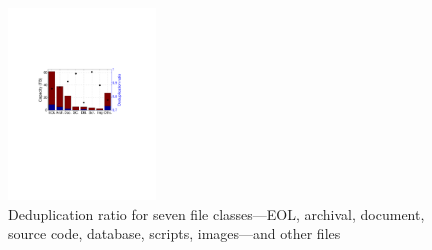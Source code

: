 \begin{figure} 
	\centering
	\includegraphics[width=0.35\textwidth]{graphs/dedup-overall} 
	\caption{Deduplication ratio for seven file classes---EOL, archival, document, source code, database, scripts, images---and other files
%
%
%
} 
	\label{fig:dedup-overall} 
\end{figure}

